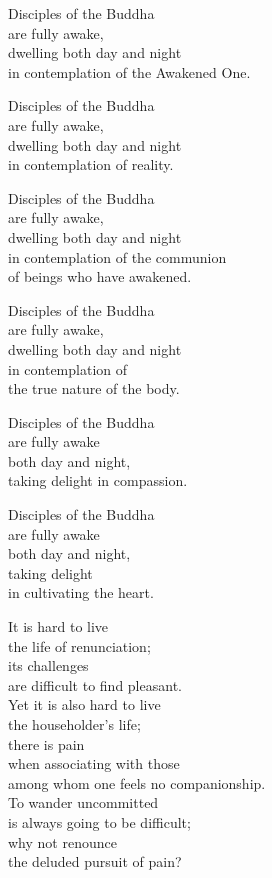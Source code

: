 Disciples of the Buddha\\
are fully awake,\\
dwelling both day and night\\
in contemplation of the Awakened One.


Disciples of the Buddha\\
are fully awake,\\
dwelling both day and night\\
in contemplation of reality.


Disciples of the Buddha\\
are fully awake,\\
dwelling both day and night\\
in contemplation of the communion\\
of beings who have awakened.


Disciples of the Buddha\\
are fully awake,\\
dwelling both day and night\\
in contemplation of\\
the true nature of the body.


Disciples of the Buddha\\
are fully awake\\
both day and night,\\
taking delight in compassion.


Disciples of the Buddha\\
are fully awake\\
both day and night,\\
taking delight\\
in cultivating the heart.


It is hard to live\\
the life of renunciation;\\
its challenges\\
are difficult to find pleasant.\\
Yet it is also hard to live\\
the householder's life;\\
there is pain\\
when associating with those\\
among whom one feels no companionship.\\
To wander uncommitted\\
is always going to be difficult;\\
why not renounce\\
the deluded pursuit of pain?


